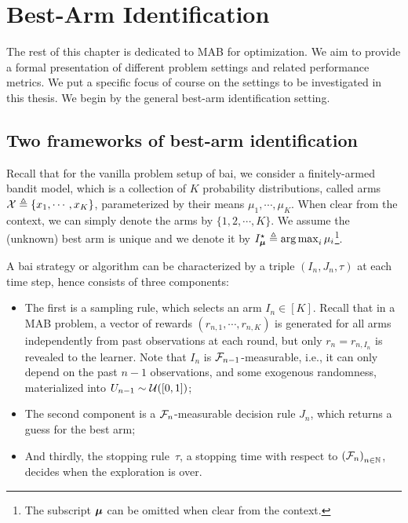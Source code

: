 \section{Best-Arm Identification}\label{sec:mab.bai}

The rest of this chapter is dedicated to MAB for optimization. We aim to provide a formal presentation of different problem settings and related performance metrics. We put a specific focus of course on the settings to be investigated in this thesis. We begin by the general best-arm identification setting.

\subsection{Two frameworks of best-arm identification}\label{sec:mab.bai.frameworks}

Recall that for the vanilla problem setup of \gls{bai}, we consider a finitely-armed bandit model, which is a collection of $K$ probability distributions, called arms $\mathcal{X}\triangleq\{x_1,\cdots,x_K\}$, parameterized by their means $\mu_1, \cdots, \mu_K$. When clear from the context, we can simply denote the arms by $\{1,2,\cdots,K\}$. We assume the (unknown) best arm is unique and we denote it by $I_{{\boldsymbol \mu}}^\star \triangleq \operatorname*{arg\,max}_i \mu_i$\footnote{The subscript ${\boldsymbol \mu}$ can be omitted when clear from the context.}. 

A \gls{bai} strategy or algorithm can be characterized by a triple $(I_n, J_n, \tau)$ at each time step, hence consists of three components: 
\begin{itemize}
    \item The first is a \gls{sampling rule}, which selects an arm $I_n\in[K]$. Recall that in a MAB problem, a vector of rewards $(r_{n,1},\cdots,r_{n,K})$ is generated for all arms independently from past observations at each round, but only $r_n = r_{n,I_n}$ is revealed to the learner. Note that $I_n$ is $\mathcal{F}_{n-1}$-measurable, i.e., it can only depend on the past $n-1$ observations, and some exogenous randomness, materialized into $U_{n-1} \sim \mathcal{U}([0,1])$;
    \item The second component is a $\mathcal{F}_{n}$-measurable \gls{decision rule} $J_n$, which returns a guess for the best arm;
    \item And thirdly, the \gls{stopping rule}~$\tau$, a stopping time with respect to $\left(\mathcal{F}_{n}\right)_{n \in \mathbb{N}}$, decides when the exploration is over.
\end{itemize}

